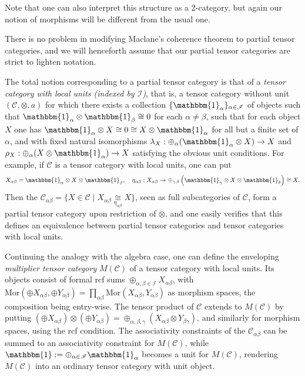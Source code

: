 \documentclass[10pt]{article}
\newcommand{\CatC}{\mathcal{C}}
\newcommand{\Mor}{\mathrm{Mor}}
\newcommand{\Unitb}{\mathbbm{1}}
\theoremstyle{definition}
\numberwithin{equation}{section}
\begin{document}
Note that one can also interpret this structure as a 2-category, but again our notion of morphisms will be different from the usual one.

There is no problem in modifying Maclane's coherence theorem to partial tensor categories, and we will henceforth assume that our partial tensor categories are strict to lighten notation. 

The total notion corresponding to a partial tensor category is that of a \emph{tensor category with local units (indexed by $\mathscr{I}$)}, that is, a tensor category without unit $(\CatC,\otimes,a)$  for which there exists a collection $\{\Unitb_\alpha\}_{\alpha\in \mathscr{I}}$ of objects such that $\Unitb_\alpha\otimes \Unitb_\beta \cong 0$ for each $\alpha\neq \beta$, such that for each object $X$ one has $\Unitb_\alpha\otimes X \cong 0 \cong X\otimes \Unitb_\alpha$ for all but a finite set of $\alpha$, and with fixed natural isomorphisms $\lambda_X:\oplus_\alpha (\Unitb_\alpha\otimes X) \rightarrow X$ and $\rho_X:\oplus_\alpha(X\otimes \Unitb_\alpha)\rightarrow X$ satisfying the obvious unit conditions. For example, if $\CatC$ is a tensor category with local units, one can put \[X_{\alpha\beta} = \Unitb_\alpha\otimes X \otimes \Unitb_\beta, \quad \eta_{\alpha\beta}:X_{\alpha\beta} \rightarrow \oplus_{\gamma,\delta} \left(\Unitb_\gamma \otimes X \otimes \Unitb_\delta\right) \cong X.\]  Then the $\CatC_{\alpha\beta} = \{X \in \CatC\mid X_{\alpha\beta} \underset{\eta_{\alpha\beta}}{\cong} X\}$, seen as full subcategories of $\CatC$, form a partial tensor category upon restriction of $\otimes$, and one easily verifies that this defines an equivalence between partial tensor categories and tensor categories with local units. 

Continuing the analogy with the algebra case, one can define the enveloping \emph{multiplier tensor category} $M(\CatC)$ of a tensor category with local units. Its objects consist of formal rcf sums $\oplus_{\alpha,\beta\in \mathscr{I}} X_{\alpha\beta}$, with $\Mor(\oplus X_{\alpha\beta},\oplus Y_{\alpha\beta}) =\prod_{\alpha\beta} \Mor(X_{\alpha\beta},Y_{\alpha\beta})$ as morphism spaces, the composition being entry-wise. The tensor product of $\CatC$ extends to $M(\CatC)$ by putting $\left(\oplus X_{\alpha\beta}\right)\otimes \left(\oplus Y_{\alpha\beta}\right) = \oplus_{\alpha,\beta,\gamma} \left(X_{\alpha\beta}\otimes Y_{\beta\gamma}\right)$, and similarly for morphism spaces, using the rcf condition. The associativity constraints of the $\CatC_{\alpha\beta}$ can be summed to an associativity constraint for $M(\CatC)$, while $\Unitb := \oplus_{\alpha\in \mathscr{I}} \Unitb_\alpha$ becomes a unit for $M(\CatC)$, rendering $M(\CatC)$ into an ordinary tensor category with unit object.
\end{document}
